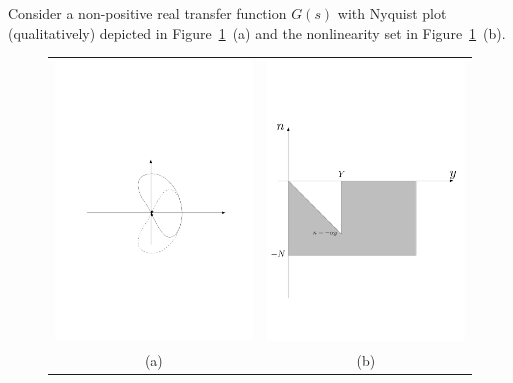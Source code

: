 \documentclass[a4paper,10pt]{article}
\begin{document}
~\\
~\\
\smallskip
Consider a non-positive real transfer function $G(s)$ with Nyquist plot (qualitatively) depicted in Figure~\ref{fig:sys}~(a) and the nonlinearity set in Figure~\ref{fig:sys}~(b).
\begin{figure}[hbt]
	\begin{tabular}{cc}
		\includegraphics[width=0.45\columnwidth]{lin} 
	&
		\includegraphics[width=0.45\columnwidth]{nonlin2}\\
	(a) & (b)
	\end{tabular}
	\caption{\label{fig:sys}}
\end{figure}
\end{document}
